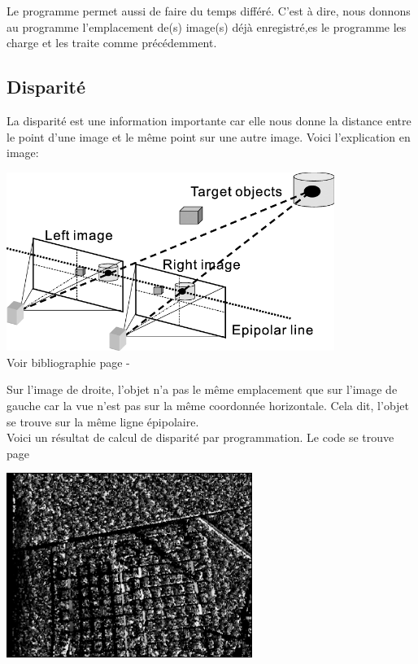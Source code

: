 \documentclass[12pt, french]{report}
\begin{document}
    Le programme permet aussi de faire du temps différé. C'est à dire, nous donnons au programme l'emplacement de(s) image(s) déjà enregistré,es le programme les charge et les traite comme précédemment.

\subsection{Disparité}

La disparité est une information importante car elle nous donne la distance entre le point d'une image et le même point sur une autre image. Voici l'explication en image:

\begin{center}
    \includegraphics[width=0.8\textwidth]{Images/Binocular-stereo-vision.png}\\
    Voir bibliographie page  \pageref{biblio} - \cite{article}
\end{center}

Sur l'image de droite, l'objet n'a pas le même emplacement que sur l'image de gauche car la vue n'est pas sur la même coordonnée horizontale. Cela dit, l'objet se trouve sur la même ligne épipolaire.\\

Voici un résultat de calcul de disparité par programmation. Le code se trouve page \pageref{disparite}
\begin{center}
    \includegraphics[width=0.6\textwidth]{Images/Code/Disparity.png}
\end{center}
\end{document}
